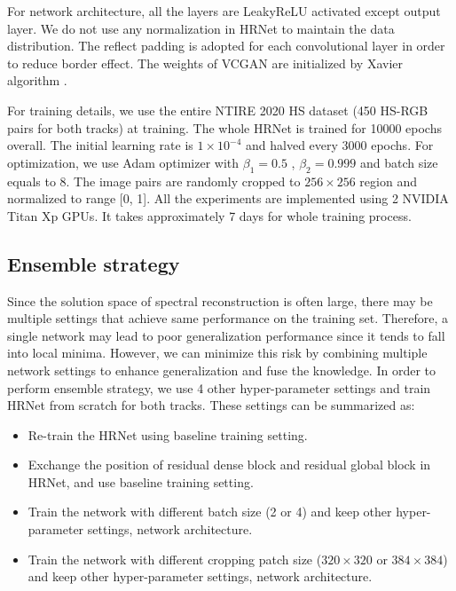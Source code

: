 \documentclass[10pt,twocolumn,letterpaper]{article}
\begin{document}
For network architecture, all the layers are LeakyReLU \cite{maas2013rectifier} activated except output layer. We do not use any normalization in HRNet to maintain the data distribution. The reflect padding is adopted for each convolutional layer in order to reduce border effect. The weights of VCGAN are initialized by Xavier algorithm \cite{glorot2010understanding}.

For training details, we use the entire NTIRE 2020 HS dataset (450 HS-RGB pairs for both tracks) at training. The whole HRNet is trained for 10000 epochs overall. The initial learning rate is $1 \times 10^{-4}$ and halved every 3000 epochs. For optimization, we use Adam optimizer with $\beta_1 = 0.5$ , $\beta_2 = 0.999$ and batch size equals to 8. The image pairs are randomly cropped to $256 \times 256$ region and normalized to range [0, 1]. All the experiments are implemented using 2 NVIDIA Titan Xp GPUs. It takes approximately 7 days for whole training process.

\subsection{Ensemble strategy}

Since the solution space of spectral reconstruction is often large, there may be multiple settings that achieve same performance on the training set. Therefore, a single network may lead to poor generalization performance since it tends to fall into local minima. However, we can minimize this risk by combining multiple network settings to enhance generalization and fuse the knowledge. In order to perform ensemble strategy, we use 4 other hyper-parameter settings and train HRNet from scratch for both tracks. These settings can be summarized as:

\begin{itemize}

\item Re-train the HRNet using baseline training setting.

\item Exchange the position of residual dense block and residual global block in HRNet, and use baseline training setting.

\item Train the network with different batch size (2 or 4) and keep other hyper-parameter settings, network architecture.

\item Train the network with different cropping patch size ($320 \times 320$ or $384 \times 384$) and keep other hyper-parameter settings, network architecture.

\end{itemize}
\end{document}
